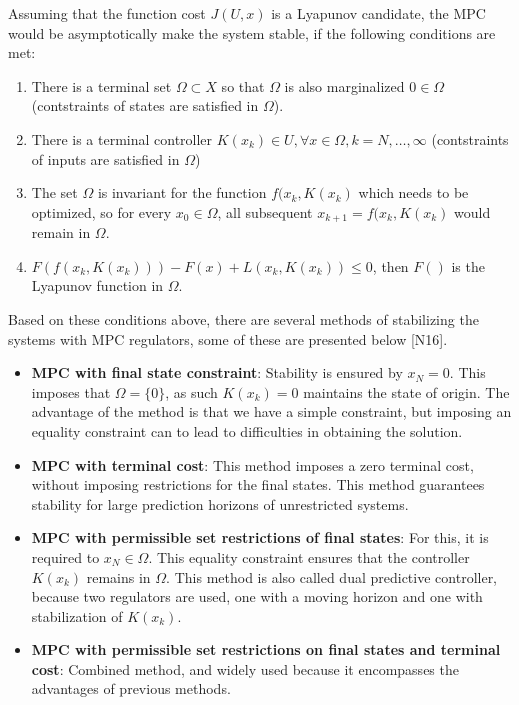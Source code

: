 Assuming that the function cost $J(U,x)$ is a Lyapunov candidate, the MPC would be asymptotically make the system stable, if the following conditions are met:
\begin{enumerate}
	\item There is a terminal set $\Omega\subset X$ so that $\Omega$ is also marginalized $0\in\Omega$ (contstraints of states are satisfied in $\Omega$).
	\item There is a terminal controller $K(x_k)\in U, \forall x\in\Omega,k=N,\dots,\infty$ (contstraints of inputs are satisfied in $\Omega$)
	\item The set $\Omega$ is invariant for the function $f(x_k,K(x_k)$ which needs to be optimized, so for every $x_0\in\Omega$, all subsequent $x_{k+1}=f(x_k,K(x_k)$ would remain in $\Omega$.
	\item $F(f(x_k,K(x_k)))-F(x)+L(x_k,K(x_k))\leq 0$, then $F()$ is the Lyapunov function in $\Omega$.
\end{enumerate}

Based on these conditions above, there are several methods of stabilizing the systems with MPC regulators, some of these are presented below [N16].

\begin{itemize}
	\item \textbf{MPC with final state constraint}: Stability is ensured by $x_N=0$. This imposes that $\Omega=\{0\}$, as such $K(x_k)=0$ maintains the state of origin. The advantage of the method is that we have a simple constraint, but imposing an equality constraint can to lead to difficulties in obtaining the solution.
	\item \textbf{MPC with terminal cost}: This method imposes a zero terminal cost, without imposing restrictions
for the final states. This method guarantees stability for large prediction horizons
of unrestricted systems.
	\item \textbf{MPC with permissible set restrictions of final states}: For this, it is required to $x_N\in\Omega$. This equality constraint ensures that the controller $K(x_k)$ remains in $\Omega$. This method is also called dual predictive controller, because two regulators are used, one with a moving horizon and one with stabilization of $K(x_k)$.
	\item \textbf{MPC with permissible set restrictions on final states and terminal cost}: Combined method, and widely used because it encompasses the advantages of previous methods.
\end{itemize}

